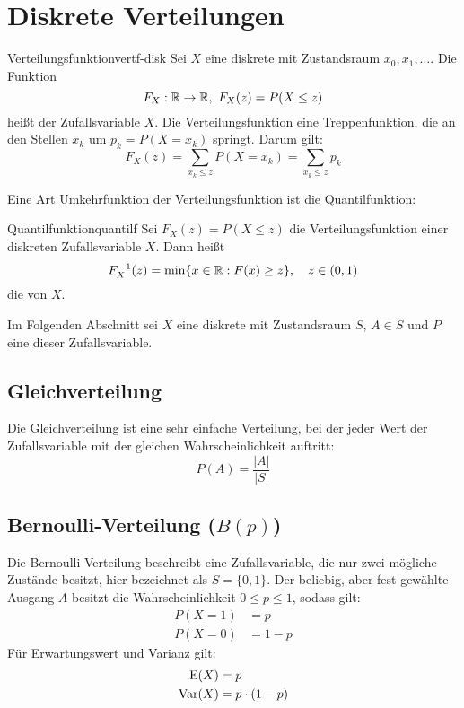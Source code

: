 \section{Diskrete Verteilungen}

\begin{definition}{Verteilungsfunktion}{vertf-disk}
Sei $X$ eine diskrete  mit Zustandsraum $x_0,
x_1, \ldots$. Die Funktion
\[
F_X:\mathbb{R}\to\mathbb{R},\ F_X(z) = P(X \le z)
\]
heißt  der Zufallsvariable $X$. Die
Verteilungsfunktion eine Treppenfunktion, die an den Stellen $x_k$ um
$p_k = P(X=x_k)$ springt. Darum gilt:
\[
F_X(z) = \sum_{x_k\le z}P(X=x_k) = \sum_{x_k\le z} p_k
\]
\end{definition}

Eine Art Umkehrfunktion der Verteilungsfunktion ist die Quantilfunktion:
\begin{definition}{Quantilfunktion}{quantilf}
Sei $F_X(z) = P(X\le z)$ die Verteilungsfunktion einer diskreten Zufallsvariable
$X$. Dann heißt
\[
F_X^{-1}(z) = \mathrm{min}\{x\in\mathbb{R}: F(x) \ge z\},\quad z\in(0,1)
\]
die  von $X$.
\end{definition}

\medskip
Im Folgenden Abschnitt sei $X$ eine diskrete 
mit Zustandsraum $S$, $A \in S$ und $P$ eine
 dieser Zufallsvariable.


\subsection{Gleichverteilung}

Die Gleichverteilung ist eine sehr einfache Verteilung, bei der jeder Wert der
Zufallsvariable mit der gleichen Wahrscheinlichkeit auftritt:
\[
P(A) = \frac{|A|}{|S|}
\]

\subsection{Bernoulli-Verteilung ($B(p)$)}

Die Bernoulli-Verteilung beschreibt eine Zufallsvariable, die nur zwei mögliche
Zustände besitzt, hier bezeichnet als $S = \{0,1\}$. Der beliebig, aber fest
gewählte Ausgang $A$ besitzt die Wahrscheinlichkeit $0 \le p \le 1$, sodass
gilt:
\begin{align*}
P(X=1)&=p  \\
P(X=0)&=1-p
\end{align*}
Für Erwartungswert und Varianz gilt:
\begin{align*}
\operatorname{E}(X) &= p \\
\operatorname{Var}(X) &= p\cdot(1-p)
\end{align*}


